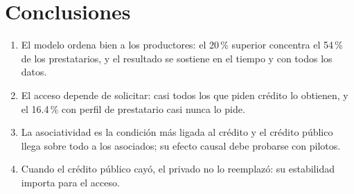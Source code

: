 \documentclass[12pt]{article}
\begin{document}
\section{Conclusiones}
\begin{enumerate}
\item El modelo ordena bien a los productores: el 20\,\% superior concentra el 54\,\% de los prestatarios, y el resultado se sostiene en el tiempo y con todos los datos.
\item El acceso depende de solicitar: casi todos los que piden crédito lo obtienen, y el 16.4\,\% con perfil de prestatario casi nunca lo pide.
\item La asociatividad es la condición más ligada al crédito y el crédito público llega sobre todo a los asociados; su efecto causal debe probarse con pilotos.
\item Cuando el crédito público cayó, el privado no lo reemplazó: su estabilidad importa para el acceso.
\end{enumerate}
\end{document}
